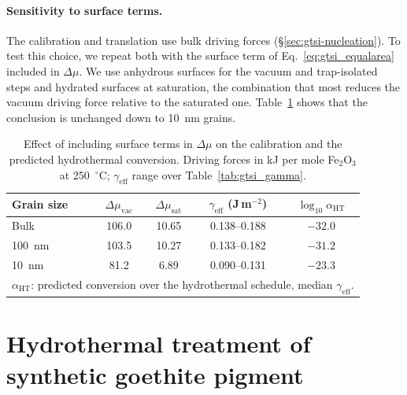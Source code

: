 \paragraph{Sensitivity to surface terms.} The calibration and translation use bulk driving
forces (\S\ref{sec:gtsi-nucleation}). To test this choice, we repeat both with the surface
term of Eq.~\eqref{eq:gtsi_equalarea} included in $\Delta\mu$. We use anhydrous surfaces for the vacuum
and trap-isolated steps and hydrated surfaces at saturation, the combination that most reduces the
vacuum driving force relative to the saturated one. Table~\ref{tab:gtsi_surf_sens} shows that the
conclusion is unchanged down to 10~nm grains.

\begin{table}[htbp]
  \centering
  \caption{Effect of including surface terms in $\Delta\mu$ on the calibration and the predicted hydrothermal conversion. Driving forces in kJ per mole Fe$_2$O$_3$ at 250~$^\circ$C; $\gamma_{\mathrm{eff}}$ range over Table~\ref{tab:gtsi_gamma}.}
  \label{tab:gtsi_surf_sens}
  \begin{tabular}{lcccc}
    \hline
    Grain size & $\Delta\mu_{\mathrm{vac}}$ & $\Delta\mu_{\mathrm{sat}}$ & $\gamma_{\mathrm{eff}}$ (J\,m$^{-2}$) & $\log_{10}\alpha_{\mathrm{HT}}$ \\
    \hline
    Bulk & 106.0 & 10.65 & 0.138--0.188 & $-32.0$ \\
    100~nm & 103.5 & 10.27 & 0.133--0.182 & $-31.2$ \\
    10~nm & 81.2 & 6.89 & 0.090--0.131 & $-23.3$ \\
    \hline
    \multicolumn{5}{l}{\footnotesize $\alpha_{\mathrm{HT}}$: predicted conversion over the hydrothermal schedule, median $\gamma_{\mathrm{eff}}$.}
  \end{tabular}
\end{table}

\section{Hydrothermal treatment of synthetic goethite pigment}\label{sec:gtsi-pigment}

